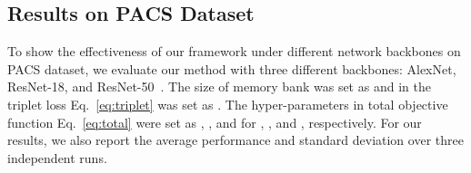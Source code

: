 \begin{table*} [!t]
	\centering
	\caption{Domain generalization results on \textbf{PACS} dataset with object recognition accuracy (\%) using \textbf{ResNet} backbones. 
		The top results are highlighted in \textbf{bold}.}
	\label{tab:results-PACS-resnet}
\end{table*}

\subsection{Results on PACS Dataset}


To show the effectiveness of our framework under different network backbones on PACS dataset, we evaluate our method with three different backbones: AlexNet, ResNet-18, and ResNet-50~\cite{He_2016_CVPR}.
The size of memory bank was set as  and  in the triplet loss Eq.~\eqref{eq:triplet} was set as .
The hyper-parameters in total objective function Eq.~\eqref{eq:total} were set as , , and  for , , and , respectively.
For our results, we also report the average performance and standard deviation over three independent runs.

